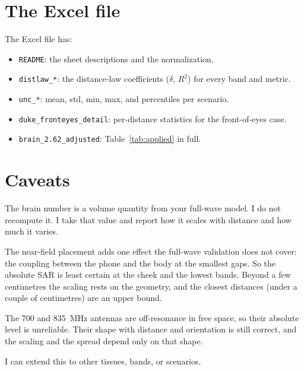 \documentclass[11pt]{article}
\begin{document}
\section*{The Excel file}

The Excel file has:
\begin{itemize}\setlength{\itemsep}{0pt}
  \item \texttt{README}: the sheet descriptions and the normalization.
  \item \texttt{distlaw\_*}: the distance-law coefficients ($\delta$, $R^2$) for
  every band and metric.
  \item \texttt{unc\_*}: mean, std, min, max, and percentiles per scenario.
  \item \texttt{duke\_fronteyes\_detail}: per-distance statistics for the
  front-of-eyes case.
  \item \texttt{brain\_2.62\_adjusted}: Table~\ref{tab:applied} in full.
\end{itemize}

\section*{Caveats}

The brain number is a volume quantity from your full-wave model. I do not
recompute it. I take that value and report how it scales with distance and how
much it varies.

The near-field placement adds one effect the full-wave validation does not cover:
the coupling between the phone and the body at the smallest gaps. So the absolute
SAR is least certain at the cheek and the lowest bands. Beyond a few centimetres
the scaling rests on the geometry, and the closest distances (under a couple of
centimetres) are an upper bound.

The \SI{700}{} and \SI{835}{MHz} antennas are off-resonance in free space, so their
absolute level is unreliable. Their shape with distance and orientation is still
correct, and the scaling and the spread depend only on that shape.

I can extend this to other tissues, bands, or scenarios.
\end{document}
